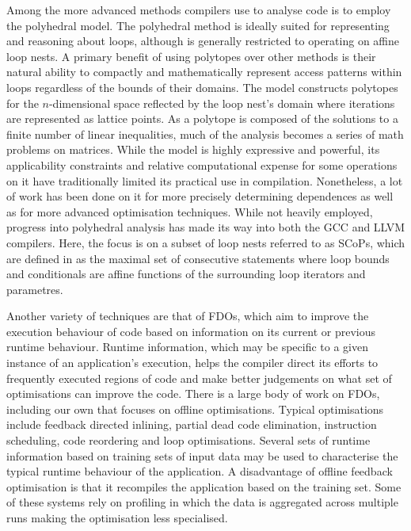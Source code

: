 Among the more advanced methods compilers use to analyse code is to employ the polyhedral model\cite{Cousot:1978:ADL:512760.512770}\cite{Bagnara:2009:APC:1628316.1628385}\cite{benabderrahmane.10.cc}.
The polyhedral method is ideally suited for representing and reasoning about loops, although is generally restricted to operating on affine loop nests.
A primary benefit of using polytopes over other methods is their natural ability to compactly and mathematically represent access patterns within loops regardless of the bounds of their domains.
The model constructs polytopes for the $n$-dimensional space reflected by the loop nest's domain where iterations are represented as lattice points.
As a polytope is composed of the solutions to a finite number of linear inequalities, much of the analysis becomes a series of math problems on matrices.
While the model is highly expressive and powerful, its applicability constraints and relative computational expense for some operations on it have traditionally limited its practical use in compilation\cite{DBLP:journals/entcs/Simon10a}.
Nonetheless, a lot of work has been done on it for more precisely determining dependences\cite{Vasilache:2006:VDA:1183401.1183448} as well as for more advanced optimisation techniques\cite{Nieuwenhuizen2014AutovectorizationUP}\cite{5260526}.
While not heavily employed, progress into polyhedral analysis has made its way into both the \ac{GCC}\cite{trifunovic:inria-00551516} and LLVM\cite{grosser.11.impact} compilers.
Here, the focus is on a subset of loop nests referred to as \acp{SCoP}\cite{TBas}, which are defined in \cite{benabderrahmane.10.cc} as the maximal set of consecutive statements where loop bounds and conditionals are affine functions of the surrounding loop iterators and parametres.

Another variety of techniques are that of \acp{FDO}, which aim to improve the execution behaviour of code based on information on its current or previous runtime behaviour\cite{Smith:2000:OCF:351403.351408}.
Runtime information, which may be specific to a given instance of an application's execution, helps the compiler direct its efforts to frequently executed regions of code and make better judgements on what set of optimisations can improve the code.
There is a large body of work on \acp{FDO}, including our own\cite{10.1007/978-3-540-68555-5_22} that focuses on offline optimisations.
Typical optimisations include feedback directed inlining, partial dead code elimination, instruction scheduling, code reordering and loop optimisations.
Several sets of runtime information based on training sets of input data may be used to characterise the typical runtime behaviour of the application.
A disadvantage of offline feedback optimisation is that it recompiles the application based on the training set.
Some of these systems rely on profiling in which the data is aggregated across multiple runs making the optimisation less specialised.

